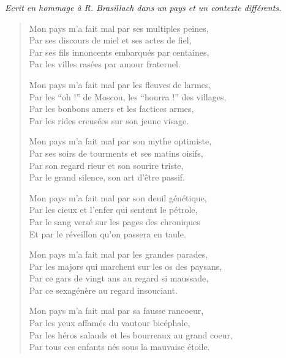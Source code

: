 \documentclass[french]{article}
\title{\bsc{Test}}
\date{2023}
\theoremstyle{definition}
\theoremstyle{remark}
\begin{document}
\maketitle

\tableofcontents




\emph{Ecrit en hommage à R. Brasillach dans un pays et un contexte différents.}

\begin{verse}

Mon pays m'a fait mal par ses multiples peines,\\
Par ses discours de miel et ses actes de fiel,\\
Par ses fils innoncents embarqués par centaines,\\
Par les villes rasées par amour fraternel.

Mon pays m'a fait mal par les fleuves de larmes,\\
Par les ``oh !'' de Moscou, les ``hourra !'' des villages,\\
Par les bonbons amers et les factices armes,\\
Par les rides creusées sur son jeune visage.

Mon pays m'a fait mal par son mythe optimiste,\\
Par ses soirs de tourments et ses matins oisifs,\\
Par son regard rieur et son sourire triste,\\
Par le grand silence, son art d'être passif.

Mon pays m'a fait mal par son deuil génétique,\\
Par les cieux et l'enfer qui sentent le pétrole,\\
Par le sang versé sur les pages des chroniques\\
Et par le réveillon qu'on passera en taule.

Mon pays m'a fait mal par les grandes parades,\\
Par les majors qui marchent sur les os des paysans,\\
Par ce gars de vingt ans au regard si maussade,\\
Par ce sexagénère au regard insouciant.

Mon pays m'a fait mal par sa fausse rancoeur,\\
Par les yeux affamés du vautour bicéphale,\\
Par les héros salauds et les bourreaux au grand coeur,\\
Par tous ces enfants nés sous la mauvaise étoile.


\end{verse}
\end{document}
